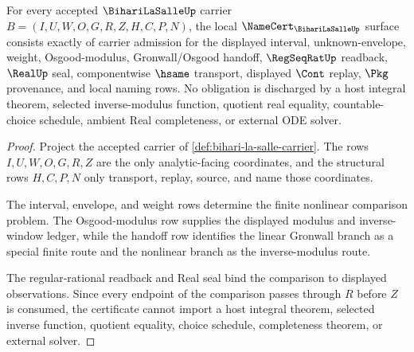 \begin{theorem}
\label{thm:bihari-la-salle-namecert-obligations}
For every accepted $\BihariLaSalleUp$ carrier $B=(I,U,W,O,G,R,Z,H,C,P,N)$, the local $\NameCert_{\BihariLaSalleUp}$ surface consists exactly of carrier admission for the displayed interval, unknown-envelope, weight, Osgood-modulus, Gronwall/Osgood handoff, $\RegSeqRatUp$ readback, $\RealUp$ seal, componentwise $\hsame$ transport, displayed $\Cont$ replay, $\Pkg$ provenance, and local naming rows. No obligation is discharged by a host integral theorem, selected inverse-modulus function, quotient real equality, countable-choice schedule, ambient Real completeness, or external ODE solver.
\end{theorem}
\begin{proof}
Project the accepted carrier of \autoref{def:bihari-la-salle-carrier}. The rows $I,U,W,O,G,R,Z$ are the only analytic-facing coordinates, and the structural rows $H,C,P,N$ only transport, replay, source, and name those coordinates.

The interval, envelope, and weight rows determine the finite nonlinear comparison problem. The Osgood-modulus row supplies the displayed modulus and inverse-window ledger, while the handoff row identifies the linear Gronwall branch as a special finite route and the nonlinear branch as the inverse-modulus route.

The regular-rational readback and Real seal bind the comparison to displayed observations. Since every endpoint of the comparison passes through $R$ before $Z$ is consumed, the certificate cannot import a host integral theorem, selected inverse function, quotient equality, choice schedule, completeness theorem, or external solver.
\end{proof}

